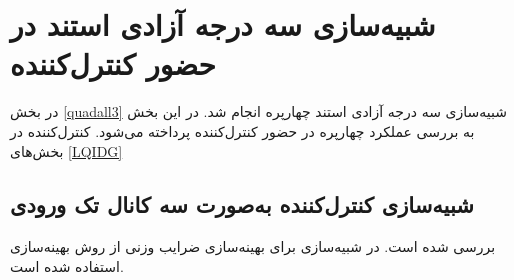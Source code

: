 \section{شبیه‌سازی سه درجه آزادی استند در حضور کنترل‌کننده }\label{roll_pitch_yaw_lqidg_section}
در بخش
\ref{quadall3}
شبیه‌سازی سه درجه آزادی استند چهارپره انجام شد. در این بخش به بررسی عملکرد چهارپره در حضور کنترل‌کننده  پرداخته می‌شود. کنترل‌کننده  در بخش‌های
\ref{LQIDG}
\subsection{شبیه‌سازی کنترل‌کننده به‌صورت سه کانال تک ورودی}
بررسی شده است.
 در شبیه‌سازی برای بهینه‌سازی ضرایب وزنی  از روش بهینه‌سازی
 \cite{Karimi2010}
استفاده شده است.

%
